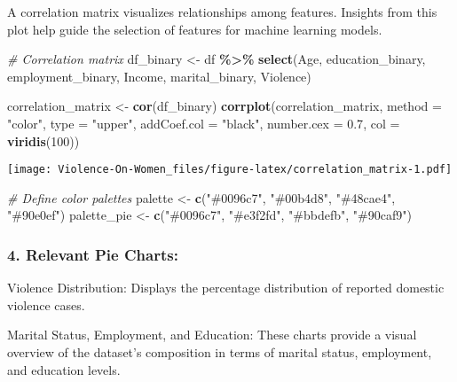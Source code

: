 \documentclass[
]{article}
\newenvironment{Shaded}{\begin{snugshade}}{\end{snugshade}}
\newcommand{\AttributeTok}[1]{\textcolor[rgb]{0.13,0.29,0.53}{#1}}
\newcommand{\CommentTok}[1]{\textcolor[rgb]{0.56,0.35,0.01}{\textit{#1}}}
\newcommand{\DecValTok}[1]{\textcolor[rgb]{0.00,0.00,0.81}{#1}}
\newcommand{\FloatTok}[1]{\textcolor[rgb]{0.00,0.00,0.81}{#1}}
\newcommand{\FunctionTok}[1]{\textcolor[rgb]{0.13,0.29,0.53}{\textbf{#1}}}
\newcommand{\NormalTok}[1]{#1}
\newcommand{\OtherTok}[1]{\textcolor[rgb]{0.56,0.35,0.01}{#1}}
\newcommand{\SpecialCharTok}[1]{\textcolor[rgb]{0.81,0.36,0.00}{\textbf{#1}}}
\newcommand{\StringTok}[1]{\textcolor[rgb]{0.31,0.60,0.02}{#1}}
\begin{document}
A correlation matrix visualizes relationships among features. Insights
from this plot help guide the selection of features for machine learning
models.

\begin{Shaded}
\begin{Highlighting}[]
\CommentTok{\# Correlation matrix}
\NormalTok{df\_binary }\OtherTok{\textless{}{-}}\NormalTok{ df }\SpecialCharTok{\%\textgreater{}\%}
  \FunctionTok{select}\NormalTok{(Age, education\_binary, employment\_binary, Income, marital\_binary, Violence)}

\NormalTok{correlation\_matrix }\OtherTok{\textless{}{-}} \FunctionTok{cor}\NormalTok{(df\_binary)}
\FunctionTok{corrplot}\NormalTok{(correlation\_matrix, }
         \AttributeTok{method =} \StringTok{"color"}\NormalTok{, }
         \AttributeTok{type =} \StringTok{"upper"}\NormalTok{, }
         \AttributeTok{addCoef.col =} \StringTok{"black"}\NormalTok{,}
         \AttributeTok{number.cex =} \FloatTok{0.7}\NormalTok{,}
         \AttributeTok{col =} \FunctionTok{viridis}\NormalTok{(}\DecValTok{100}\NormalTok{))}
\end{Highlighting}
\end{Shaded}

\texttt{[image: Violence-On-Women\_files/figure-latex/correlation\_matrix-1.pdf]}

\begin{Shaded}
\begin{Highlighting}[]
\CommentTok{\# Define color palettes}
\NormalTok{palette }\OtherTok{\textless{}{-}} \FunctionTok{c}\NormalTok{(}\StringTok{"\#0096c7"}\NormalTok{, }\StringTok{"\#00b4d8"}\NormalTok{, }\StringTok{"\#48cae4"}\NormalTok{, }\StringTok{"\#90e0ef"}\NormalTok{)}
\NormalTok{palette\_pie }\OtherTok{\textless{}{-}} \FunctionTok{c}\NormalTok{(}\StringTok{"\#0096c7"}\NormalTok{, }\StringTok{"\#e3f2fd"}\NormalTok{, }\StringTok{"\#bbdefb"}\NormalTok{, }\StringTok{"\#90caf9"}\NormalTok{)}
\end{Highlighting}
\end{Shaded}

\hypertarget{relevant-pie-charts}{%
\subsubsection{4. Relevant Pie Charts:}\label{relevant-pie-charts}}

Violence Distribution: Displays the percentage distribution of reported
domestic violence cases.

Marital Status, Employment, and Education: These charts provide a visual
overview of the dataset's composition in terms of marital status,
employment, and education levels.
\end{document}

